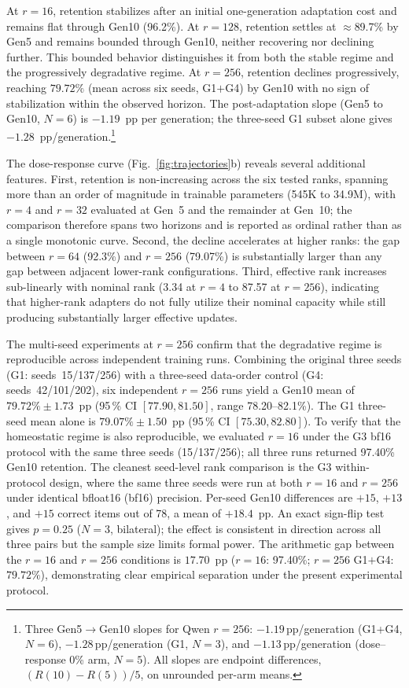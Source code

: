 \documentclass[a4paper,fleqn]{cas-dc}
\newif\ifshowchanges
\newcommand{\rev}[1]{\ifshowchanges{\color{blue}#1}\else{#1}\fi}
\begin{document}
At $r=16$, retention stabilizes after
an initial one-generation adaptation cost and remains flat through Gen10
(96.2\%). At $r=128$, retention settles at
$\approx$89.7\% by Gen5 and remains bounded through Gen10, neither
recovering nor declining further. This bounded behavior distinguishes it from
both the stable regime and the progressively degradative regime. At
$r=256$, retention declines progressively,
reaching \rev{$79.72\%$} (mean across \rev{six seeds, G1$+$G4}) by Gen10 with no sign of
stabilization within the observed horizon. The post-adaptation slope
\rev{(Gen5 to Gen10, $N=6$) is $-1.19$~pp per generation; the three-seed G1 subset alone gives $-1.28$~pp/generation.}\footnote{\rev{Three Gen5$\to$Gen10 slopes for Qwen $r=256$: $-1.19$\,pp/generation (G1+G4, $N=6$), $-1.28$\,pp/generation (G1, $N=3$), and $-1.13$\,pp/generation (dose--response 0\% arm, $N=5$). All slopes are endpoint differences, $(R(10)-R(5))/5$, on unrounded per-arm means.}}

The dose-response curve (Fig.~\ref{fig:trajectories}b) reveals several
additional features. First, \rev{retention is non-increasing across the six tested ranks, spanning more than an order of magnitude in trainable parameters (545K to 34.9M), with $r=4$ and $r=32$ evaluated at Gen~5 and the remainder at Gen~10; the comparison therefore spans two horizons and is reported as ordinal rather than as a single monotonic curve}. Second, the
decline accelerates at higher ranks: the gap between $r=64$ (92.3\%) and $r=256$
(79.07\%) is substantially larger than any gap between adjacent lower-rank
configurations. Third, effective rank increases sub-linearly with nominal rank
(3.34 at $r=4$ to 87.57 at $r=256$), indicating that higher-rank adapters do not
fully utilize their nominal capacity while still producing substantially larger
effective updates.

The multi-seed experiments at $r=256$ confirm that the degradative regime is
reproducible across independent training runs.
\rev{Combining the original three seeds (G1: seeds~15/137/256) with a three-seed
data-order control (G4: seeds~42/101/202), six independent $r=256$ runs
yield a Gen10 mean of $79.72\%\pm1.73$~pp
(95\,\% CI $[77.90, 81.50]$, range 78.20--82.1\%).
The G1 three-seed mean alone is $79.07\%\pm1.50$~pp
(95\,\% CI $[75.30, 82.80]$).}
To verify that the homeostatic regime is also reproducible, we evaluated $r=16$
under the G3 bf16 protocol with the same three seeds (15/137/256); all three runs
returned 97.40\% Gen10 retention.
\rev{The cleanest seed-level rank comparison is the G3 within-protocol design,
where the same three seeds were run at both $r=16$ and $r=256$ under identical
\rev{bfloat16 (bf16)} precision. Per-seed Gen10 differences are $+15$, $+13$, and $+15$ correct
items out of 78, a mean of $+18.4$~pp. An exact sign-flip test gives $p=0.25$
($N=3$, bilateral); the effect is consistent in direction across all three pairs
but the sample size limits formal power.}
The arithmetic gap between the $r=16$ and $r=256$ conditions is
$17.70$~pp ($r=16$: 97.40\%; $r=256$ G1$+$G4: $79.72\%$),
demonstrating clear empirical separation under the present experimental protocol.
\end{document}
